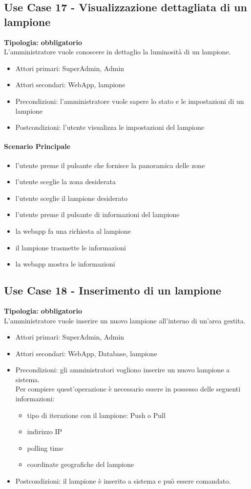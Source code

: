 \documentclass[12pt]{article}
\begin{document}
\subsection{Use Case 17 - Visualizzazione dettagliata di un lampione}
\textbf{Tipologia: obbligatorio} \\
L'amministratore vuole conoscere in dettaglio la luminosità di un lampione.
\begin{itemize}
	\item Attori primari: SuperAdmin, Admin
	\item Attori secondari: WebApp, lampione
	\item Precondizioni: l'amministratore vuole sapere lo stato e le impostazioni di un lampione
	\item Postcondizioni: l'utente visualizza le impostazioni del lampione
\end{itemize}
\paragraph{Scenario Principale}
\begin{itemize}
	\item l'utente preme il pulsante che fornisce la panoramica delle zone
	\item l'utente sceglie la zona desiderata
	\item l'utente sceglie il lampione desiderato
	\item l'utente preme il pulsante di informazioni del lampione
	\item la webapp fa una richiesta al lampione
	\item il lampione trasmette le informazioni
	\item la webapp mostra le informazioni
\end{itemize}

\subsection{Use Case 18 - Inserimento di un lampione}
\textbf{Tipologia: obbligatorio}\\
L'amministratore vuole inserire un nuovo lampione all'interno di un'area gestita.
\begin{itemize}
	\item Attori primari: SuperAdmin, Admin
	\item Attori secondari: WebApp, Database, lampione
	\item Precondizioni: gli amministratori vogliono inserire un nuovo lampione a sistema.\\
	 Per compiere quest'operazione è necessario essere in possesso delle seguenti informazioni: 
	\begin{itemize}
		\item tipo di iterazione con il lampione: Push o Pull
		\item indirizzo IP
		\item polling time
		\item coordinate geografiche del lampione
	\end{itemize}
	\item Postcondizioni: il lampione è inserito a sistema e può essere comandato.
\end{itemize}
\end{document}
